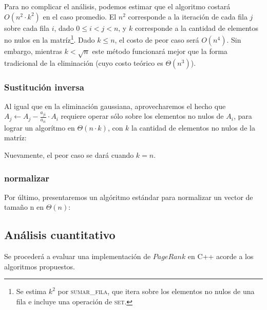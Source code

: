 Para no complicar el análisis, podemos estimar que el algoritmo costará $O(n^2 \cdot k^2)$ en el caso promedio. El $n^2$ corresponde a la iteración de cada fila $j$ sobre cada fila $i$, dado $0 \leq i < j < n$, y $k$ corresponde a la cantidad de elementos no nulos en la matríz\footnote{Se estima $k^2$ por \textsc{sumar\_fila}, que itera sobre los elementos no nulos de una fila e incluye una operación de \textsc{set}.}. Dado $k \leq n$, el costo de peor caso será $O(n^4)$. Sin embargo, mientras $k < \sqrt{n}$ este método funcionará mejor que la forma tradicional de la eliminación (cuyo costo teórico es $\Theta(n^3)$).     





\vspace{2em}
\subsubsection{Sustitución inversa} Al igual que en la eliminación gaussiana, aprovecharemos el hecho que $A_j \leftarrow A_j - \frac{a_{ji}}{a_{ii}}\cdot A_i$ requiere operar sólo sobre los elementos no nulos de $A_i$, para lograr un algorítmo en $\Theta(n \cdot k)$, con $k$ la cantidad de elementos no nulos de la matríz:
\vspace{1em}


\vspace{1em}

\noindent Nuevamente, el peor caso se dará cuando $k = n$. 



\vspace{2em}
\subsubsection{normalizar} Por último, presentaremos un algóritmo estándar para normalizar un vector de tamaño n en $\Theta(n)$:
\vspace{1em}



\newpage
\subsection{Análisis cuantitativo}\label{cuantitativo} Se procederá a evaluar una implementación de $PageRank$ en C++ acorde a los algoritmos propuestos.

